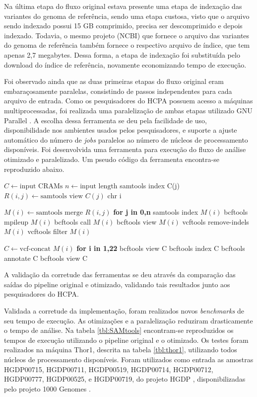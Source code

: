 \documentclass[cic,tc]{iiufrgs}
\begin{document}
Na última etapa do fluxo original estava presente uma etapa de indexação das
variantes do genoma de referência, sendo uma etapa custosa, visto que o arquivo
sendo indexado possui 15 GB comprimido, precisa ser descomprimido e depois
indexado. Todavia, o mesmo projeto (NCBI) que fornece o arquivo das variantes
do genoma de referência também fornece o respectivo arquivo de índice, que tem
apenas 2,7 megabytes. Dessa forma, a etapa de indexação foi substituída pelo
download do índice de referência, novamente economizando tempo de execução.

Foi observado ainda que as duas primeiras etapas do fluxo original eram
embaraçosamente paralelas, consistindo de passos independentes para cada
arquivo de entrada.  Como os pesquisadores do HCPA possuem acesso a máquinas
multiprocessadas, foi realizada uma paralelização de ambas etapas utilizado GNU
Parallel \cite{tange_ole_2021_5233953}. A escolha dessa ferramenta se deu pela
facilidade de uso, disponibilidade nos ambientes usados pelos pesquisadores, e
suporte a ajuste automático do número de \textit{jobs} paralelos ao número de
núcleos de processamento disponíveis. Foi desenvolvida uma ferramenta para
execução do fluxo de análise otimizado e paralelizado. Um pseudo código da
ferramenta encontra-se reproduzido abaixo.

\begin{algorithmic}
  \State $C \gets \text{input CRAMs}$
  \State $n \gets \text{input length}$
  \State samtools index C(j)
    \State $R(i,j) \gets \text{samtools view } C(j) \text{ chr i}$
  \EndFor
\EndFor

  \State $M(i) \gets \text{samtools merge } R(i,j)$ \textbf{for j in 0,n}
  \State samtools index $M(i)$
  \State bcftools mpileup $M(i)$
  \State bcftools call $M(i)$
  \State bcftools view $M(i)$
  \State vcftools remove-indels $M(i)$
  \State vcftools filter $M(i)$
\EndFor

\State $C \gets \text{vcf-concat } M(i)$ \textbf{for i in 1,22}
\State bcftools view C
\State bcftools index C
\State bcftools annotate C
\State bcftools view C
\end{algorithmic}

A validação da corretude das ferramentas se deu através da comparação das
saídas do pipeline original e otimizado, validando tais resultados junto aos
pesquisadores do HCPA.

Validada a corretude da implementação, foram realizados novos \textit{benchmarks} de seu
tempo de execução. As otimizações e a paralelização reduziram drasticamente o
tempo de análise. Na tabela \ref{tbl:SAMtools} encontram-se reproduzidos os
tempos de execução utilizando o pipeline original e o otimizado. Os testes
foram realizados na máquina Thor1, descrita na tabela \ref{tbl:thor1},
utilizando todos núcleos de processamento disponíveis. Foram utilizados como
entrada as amostras HGDP00715, HGDP00711, HGDP00519, HGDP00714, HGDP00712,
HGDP00777, HGDP00525, e HGDP00719, do projeto HGDP \cite{cavalli2005human},
disponibilizadas pelo projeto 1000 Genomes \cite{via20101000}.
\end{document}
